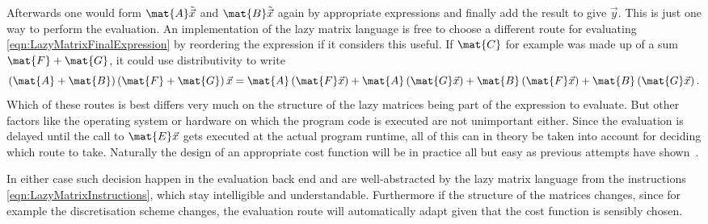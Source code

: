 Afterwards one would form $\mat{A} \tilde{\vec{x}}$ and $\mat{B} \tilde{\vec{x}}$
again by appropriate \contraction expressions
and finally add the result to give $\vec{y}$.
This is just one way to perform the evaluation.
An implementation of the lazy matrix language is free to choose
a different route for evaluating \eqref{eqn:LazyMatrixFinalExpression}
by reordering the expression if it considers this useful.
If $\mat{C}$ for example was made up of a sum $\mat{F} + \mat{G}$,
it could use distributivity to write
\[ \left( \mat{A} + \mat{B} \right) \left( \mat{F} + \mat{G} \right) \vec{x}
	= \mat{A} \left( \mat{F} \vec{x} \right) + \mat{A} \left( \mat{G}\vec{x}\right)
	+ \mat{B} \left( \mat{F} \vec{x} \right) + \mat{B} \left( \mat{G}\vec{x}\right).
\]
Which of these routes is best differs very much on the structure
of the lazy matrices being part of the expression to evaluate.
But other factors like the operating system or hardware on which
the program code is executed are not unimportant either.
Since the evaluation is delayed
until the call to $\mat{E}\vec{x}$ gets executed at the actual program runtime,
all of this can in theory be taken into account for deciding
which route to take.
Naturally the design of an appropriate cost function
will be in practice all but easy
as previous attempts have shown~.

In either case such decision happen in the evaluation back end
and are well-abstracted by the lazy matrix language
from the instructions \eqref{eqn:LazyMatrixInstructions},
which stay intelligible and understandable.
Furthermore if the structure of the matrices changes,
since for example the discretisation scheme changes,
the evaluation route will automatically adapt
given that the cost function is sensibly chosen.

%
%
\defineabbr{LA}{LA\xspace}{linear algebra}
